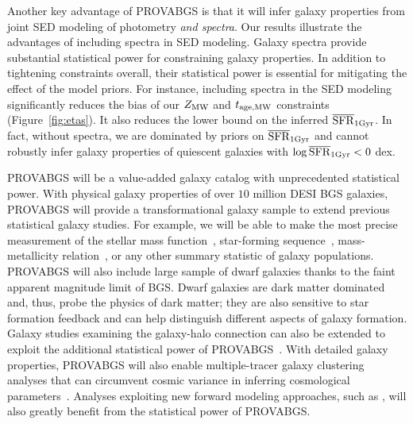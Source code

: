 Another key advantage of {\sc PROVABGS} is that it will infer galaxy
properties from joint SED modeling of photometry \emph{and spectra}. 
Our results illustrate the advantages of including spectra in SED modeling. 
Galaxy spectra provide substantial statistical power for constraining 
galaxy properties. 
In addition to tightening constraints overall, their statistical power is
essential for mitigating the effect of the model priors. 
For instance, including spectra in the SED modeling significantly reduces the
bias of our $Z_{\rm MW}$ and $t_{\rm age, MW}$ constraints (Figure~\ref{fig:etas}). 
It also reduces the lower bound on the inferred $\overline{\rm SFR}_{\rm 1Gyr}$. 
In fact, without spectra, we are dominated by priors on $\overline{\rm SFR}_{\rm 1Gyr}$ and cannot
robustly infer galaxy properties of quiescent galaxies with $\log\overline{\rm SFR}_{\rm 1Gyr} < 0$
dex.

{\sc PROVABGS} will be a value-added galaxy catalog with unprecedented
statistical power. 
With physical galaxy properties of over $10$ million DESI BGS galaxies, 
{\sc PROVABGS} will provide a transformational galaxy sample to extend
previous statistical galaxy studies. 
For example, we will be able to make the most precise measurement of the
stellar mass function~\citep[SMF]{li2009, moustakas2013}, star-forming
sequence~\citep{noeske2007}, mass-metallicity relation~\citep{tremonti2004}, or
any other summary statistic of galaxy populations. 
{\sc PROVABGS} will also include large sample of dwarf galaxies thanks to the
faint apparent magnitude limit of BGS. 
Dwarf galaxies are dark matter dominated and, thus, probe the physics of
dark matter; they are also sensitive to star formation feedback and can help
distinguish different aspects of galaxy formation. 
Galaxy studies examining the galaxy-halo connection can also be extended to
exploit the additional statistical power of {\sc
PROVABGS}~\citep[\emph{e.g.}][]{tinker2011, wetzel2013, zu2015, hahn2017,
hahn2019b}. 
With detailed galaxy properties, {\sc PROVABGS} will also enable
multiple-tracer galaxy clustering analyses that can circumvent cosmic variance
in inferring cosmological parameters~\citep{seljak2009, mcdonald2009,
wang2020}.
Analyses exploiting new forward modeling approaches, such as \cite{hahn2021},
will also greatly benefit from the statistical power of {\sc PROVABGS}.

